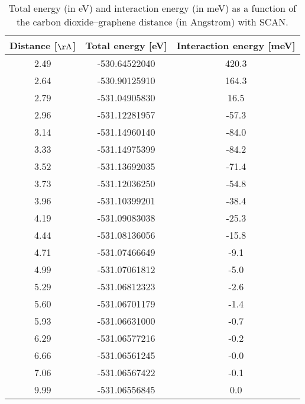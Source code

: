 \begin{table}[h]
\centering
\begin{tabular}{ccc}
\hline
Distance [$\mathrm{\AA}$] & Total energy [eV] & Interaction energy [meV] \\
\hline
2.49 & -530.64522040 & 420.3 \\
2.64 & -530.90125910 & 164.3 \\
2.79 & -531.04905830 & 16.5 \\
2.96 & -531.12281957 & -57.3 \\
3.14 & -531.14960140 & -84.0 \\
3.33 & -531.14975399 & -84.2 \\
3.52 & -531.13692035 & -71.4 \\
3.73 & -531.12036250 & -54.8 \\
3.96 & -531.10399201 & -38.4 \\
4.19 & -531.09083038 & -25.3 \\
4.44 & -531.08136056 & -15.8 \\
4.71 & -531.07466649 & -9.1 \\
4.99 & -531.07061812 & -5.0 \\
5.29 & -531.06812323 & -2.6 \\
5.60 & -531.06701179 & -1.4 \\
5.93 & -531.06631000 & -0.7 \\
6.29 & -531.06577216 & -0.2 \\
6.66 & -531.06561245 & -0.0 \\
7.06 & -531.06567422 & -0.1 \\
9.99 & -531.06556845 & 0.0 \\
\hline
\end{tabular}
\caption{Total energy (in eV) and interaction energy (in meV) as a function of the carbon dioxide--graphene distance (in Angstrom) with SCAN.}
\label{SI_dft_table_SCAN}
\end{table}